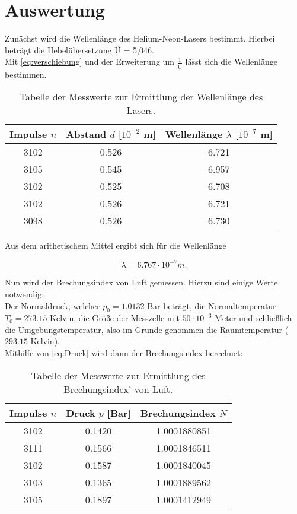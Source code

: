 \section{Auswertung}
\label{sec:Auswertung}

Zunächst wird die Wellenlänge des Helium-Neon-Lasers bestimmt. Hierbei beträgt die Hebelübersetzung Ü = 5,046.\\
Mit \autoref{eq:verschiebung} und der Erweiterung um \(\frac{1}{Ü}\) lässt sich die Wellenlänge bestimmen.

\begin{table}
  \centering
  \caption{Tabelle der Messwerte zur Ermittlung der Wellenlänge des Lasers.}
  \label{tab:tab1}
  \begin{tabular}{c | c | c}
    \toprule
    Impulse \(n\) & Abstand \(d\) [\(10^{-2}\) m] & Wellenlänge \(\lambda\) [\(10^{-7}\) m]\\
    \midrule
    3102 & 0.526 & 6.721\\
    3105 & 0.545 & 6.957\\
    3102 & 0.525 & 6.708\\
    3102 & 0.526 & 6.721\\
    3098 & 0.526 & 6.730\\
    \bottomrule
  \end{tabular}
\end{table}

Aus dem arithetischem Mittel ergibt sich für die Wellenlänge 

\begin{equation}
  \lambda = 6.767 \cdot 10^{-7} m.
\end{equation}

Nun wird der Brechungsindex von Luft gemessen. Hierzu sind einige Werte notwendig:\\
Der Normaldruck, welcher \(p_0 = 1.0132\) Bar beträgt, die Normaltemperatur \(T_0 = 273.15\) Kelvin, die Größe der Messzelle mit \(50 \cdot 10^{-3}\) Meter und schließlich die Umgebungstemperatur, also im Grunde genommen die Raumtemperatur (\(293.15\) Kelvin).\\
Mithilfe von \autoref{eq:Druck} wird dann der Brechungsindex berechnet:

\begin{table}
  \centering
  \caption{Tabelle der Messwerte zur Ermittlung des Brechungsindex' von Luft.}
  \label{tab:tab2}
  \begin{tabular}{c | c | c}
    \toprule
    Impulse \(n\) & Druck \(p\) [Bar] & Brechungsindex \(N\)\\
    \midrule
    3102 & 0.1420 & 1.0001880851\\
    3111 & 0.1566 & 1.0001846511\\
    3102 & 0.1587 & 1.0001840045\\
    3103 & 0.1365 & 1.0001889562\\
    3105 & 0.1897 & 1.0001412949\\
    \bottomrule
  \end{tabular}
\end{table}

